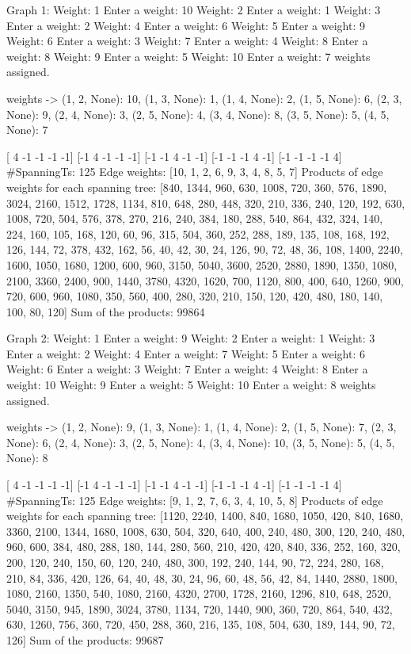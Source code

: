 
Graph 1:
Weight: 1
Enter a weight: 10
Weight: 2
Enter a weight: 1
Weight: 3
Enter a weight: 2
Weight: 4
Enter a weight: 6
Weight: 5
Enter a weight: 9
Weight: 6
Enter a weight: 3
Weight: 7
Enter a weight: 4
Weight: 8
Enter a weight: 8
Weight: 9
Enter a weight: 5
Weight: 10
Enter a weight: 7
weights assigned.

weights -> {(1, 2, None): 10, (1, 3, None): 1, (1, 4, None): 2, (1, 5, None): 6, (2, 3, None): 9, (2, 4, None): 3, (2, 5, None): 4, (3, 4, None): 8, (3, 5, None): 5, (4, 5, None): 7}

[ 4 -1 -1 -1 -1]
[-1  4 -1 -1 -1]
[-1 -1  4 -1 -1]
[-1 -1 -1  4 -1]
[-1 -1 -1 -1  4]
#SpanningTs:  125
Edge weights: [10, 1, 2, 6, 9, 3, 4, 8, 5, 7]
Products of edge weights for each spanning tree: [840, 1344, 960, 630, 1008, 720, 360, 576, 1890, 3024, 2160, 1512, 1728, 1134, 810, 648, 280, 448, 320, 210, 336, 240, 120, 192, 630, 1008, 720, 504, 576, 378, 270, 216, 240, 384, 180, 288, 540, 864, 432, 324, 140, 224, 160, 105, 168, 120, 60, 96, 315, 504, 360, 252, 288, 189, 135, 108, 168, 192, 126, 144, 72, 378, 432, 162, 56, 40, 42, 30, 24, 126, 90, 72, 48, 36, 108, 1400, 2240, 1600, 1050, 1680, 1200, 600, 960, 3150, 5040, 3600, 2520, 2880, 1890, 1350, 1080, 2100, 3360, 2400, 900, 1440, 3780, 4320, 1620, 700, 1120, 800, 400, 640, 1260, 900, 720, 600, 960, 1080, 350, 560, 400, 280, 320, 210, 150, 120, 420, 480, 180, 140, 100, 80, 120]
Sum of the products: 99864

Graph 2:
Weight: 1
Enter a weight: 9
Weight: 2
Enter a weight: 1
Weight: 3
Enter a weight: 2
Weight: 4
Enter a weight: 7
Weight: 5
Enter a weight: 6
Weight: 6
Enter a weight: 3
Weight: 7
Enter a weight: 4
Weight: 8
Enter a weight: 10
Weight: 9
Enter a weight: 5
Weight: 10
Enter a weight: 8
weights assigned.

weights -> {(1, 2, None): 9, (1, 3, None): 1, (1, 4, None): 2, (1, 5, None): 7, (2, 3, None): 6, (2, 4, None): 3, (2, 5, None): 4, (3, 4, None): 10, (3, 5, None): 5, (4, 5, None): 8}

[ 4 -1 -1 -1 -1]
[-1  4 -1 -1 -1]
[-1 -1  4 -1 -1]
[-1 -1 -1  4 -1]
[-1 -1 -1 -1  4]
#SpanningTs:  125
Edge weights: [9, 1, 2, 7, 6, 3, 4, 10, 5, 8]
Products of edge weights for each spanning tree: [1120, 2240, 1400, 840, 1680, 1050, 420, 840, 1680, 3360, 2100, 1344, 1680, 1008, 630, 504, 320, 640, 400, 240, 480, 300, 120, 240, 480, 960, 600, 384, 480, 288, 180, 144, 280, 560, 210, 420, 420, 840, 336, 252, 160, 320, 200, 120, 240, 150, 60, 120, 240, 480, 300, 192, 240, 144, 90, 72, 224, 280, 168, 210, 84, 336, 420, 126, 64, 40, 48, 30, 24, 96, 60, 48, 56, 42, 84, 1440, 2880, 1800, 1080, 2160, 1350, 540, 1080, 2160, 4320, 2700, 1728, 2160, 1296, 810, 648, 2520, 5040, 3150, 945, 1890, 3024, 3780, 1134, 720, 1440, 900, 360, 720, 864, 540, 432, 630, 1260, 756, 360, 720, 450, 288, 360, 216, 135, 108, 504, 630, 189, 144, 90, 72, 126]
Sum of the products: 99687

